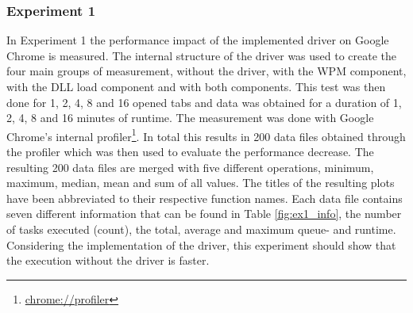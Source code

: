 \subsubsection{Experiment 1}
In Experiment 1 the performance impact of the implemented driver on Google Chrome is measured. The internal structure of the driver was used to create the four main groups of measurement, without the driver, with the \gls{WPM} component, with the \gls{DLL} load component and with both components. This test was then done for 1, 2, 4, 8 and 16 opened tabs and data was obtained for a duration of 1, 2, 4, 8 and 16 minutes of runtime. The measurement was done with Google Chrome's internal profiler\footnote{\url{chrome://profiler}}. In total this results in 200 data files obtained through the profiler which was then used to evaluate the performance decrease. The resulting 200 data files are merged with five different operations, minimum, maximum, median, mean and sum of all values. The titles of the resulting plots have been abbreviated to their respective function names. Each data file contains seven different information that can be found in Table \ref{fig:ex1_info}, the number of tasks executed (count), the total, average and maximum queue- and runtime. Considering the implementation of the driver, this experiment should show that the execution without the driver is faster.

